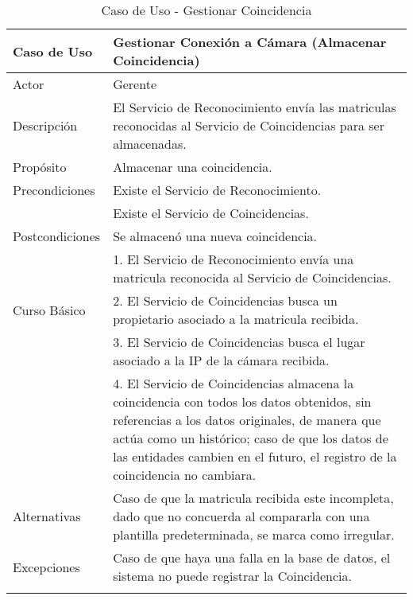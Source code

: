     
    \begin{longtable}{@{} p{3cm} p{10cm} @{}} \toprule
    \textbf{Caso de Uso}    & Gestionar Conexión a Cámara (Almacenar Coincidencia) \\ \midrule
    Actor                   & Gerente \\ \cmidrule{1-2}
    Descripción             & El Servicio de Reconocimiento envía las matriculas reconocidas al Servicio de Coincidencias para ser almacenadas. \\ \cmidrule{1-2}
    Propósito               & Almacenar una coincidencia. \\ \cmidrule{1-2}
    Precondiciones          & Existe el Servicio de Reconocimiento. \\
                            & Existe el Servicio de Coincidencias. \\ \cmidrule{1-2} 
    Postcondiciones         & Se almacenó una nueva coincidencia. \\ \cmidrule{1-2} 
                            & 1. El Servicio de Reconocimiento envía una matricula reconocida al Servicio de Coincidencias. \\ 
    Curso Básico            & 2. El Servicio de Coincidencias busca un propietario asociado a la matricula recibida. \\
                            & 3. El Servicio de Coincidencias busca el lugar asociado a la IP de la cámara recibida. \\
                            & 4. El Servicio de Coincidencias almacena la coincidencia con todos los datos obtenidos, sin referencias a los datos originales, de manera que actúa como un histórico; caso de que los datos de las entidades cambien en el futuro, el registro de la coincidencia no cambiara. \\ \cmidrule{1-2}
    Alternativas            & Caso de que la matricula recibida este incompleta, dado que no concuerda al compararla con una plantilla predeterminada, se marca como irregular. \\ \cmidrule{1-2}
    Excepciones             & Caso de que haya una falla en la base de datos, el sistema no puede registrar la Coincidencia. \\ \bottomrule
   \caption{Caso de Uso - Gestionar Coincidencia} \label{tab:tabcu-rec2}  \\
   \end{longtable}
    
